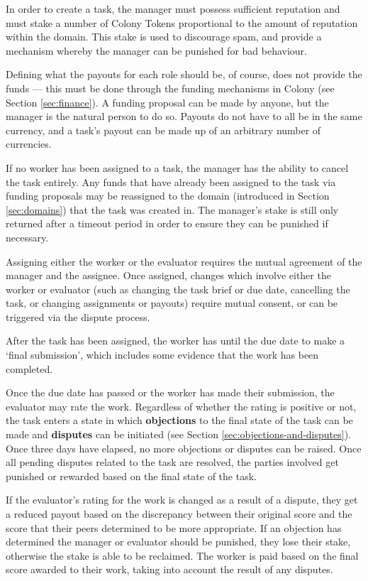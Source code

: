 In order to create a task, the manager must possess sufficient reputation and must stake a number of Colony Tokens proportional to the amount of reputation within the domain. This stake is used to discourage spam, and provide a mechanism whereby the manager can be punished for bad behaviour.

Defining what the payouts for each role should be, of course, does not provide the funds --- this must be done through the funding mechanisms in Colony (see Section \ref{sec:finance}). A funding proposal can be made by anyone, but the manager is the natural person to do so. Payouts do not have to all be in the same currency, and a task's payout can be made up of an arbitrary number of currencies.

If no worker has been assigned to a task, the manager has the ability to cancel the task entirely. Any funds that have already been assigned to the task via funding proposals may be reassigned to the domain (introduced in Section \ref{sec:domains}) that the task was created in. The manager's stake is still only returned after a timeout period in order to ensure they can be punished if necessary.

Assigning either the worker or the evaluator requires the mutual agreement of the manager and the assignee. Once assigned, changes which involve either the worker or evaluator (such as changing the task brief or due date, cancelling the task, or changing assignments or payouts) require mutual consent, or can be triggered via the dispute process.

After the task has been assigned, the worker has until the due date to make a `final submission', which includes some evidence that the work has been completed.

Once the due date has passed or the worker has made their submission, the evaluator may rate the work. Regardless of whether the rating is positive or not, the task enters a state in which \textbf{objections} to the final state of the task can be made and \textbf{disputes} can be initiated (see Section \ref{sec:objections-and-disputes}). Once three days have elapsed, no more objections or disputes can be raised. Once all pending disputes related to the task are resolved, the parties involved get punished or rewarded based on the final state of the task.

If the evaluator's rating for the work is changed as a result of a dispute, they get a reduced payout based on the discrepancy between their original score and the score that their peers determined to be more appropriate. If an objection has determined the manager or evaluator should be punished, they lose their stake, otherwise the stake is able to be reclaimed. The worker is paid based on the final score awarded to their work, taking into account the result of any disputes.


